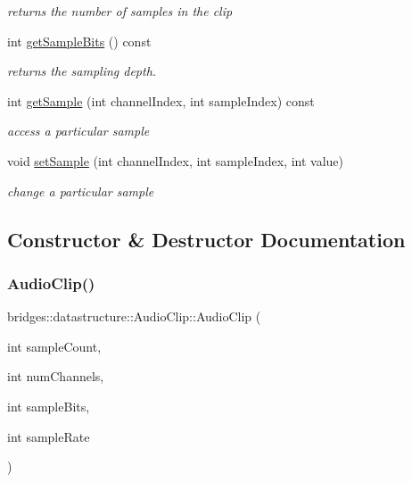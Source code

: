 \begin{DoxyCompactItemize}
\begin{DoxyCompactList}\small\item\em returns the number of samples in the clip \end{DoxyCompactList}\item 
int \hyperlink{classbridges_1_1datastructure_1_1_audio_clip_aca7c5460d005d62a7a0d2eae595e63d3}{get\+Sample\+Bits} () const
\begin{DoxyCompactList}\small\item\em returns the sampling depth. \end{DoxyCompactList}\item 
int \hyperlink{classbridges_1_1datastructure_1_1_audio_clip_a24bd273de32369cb9d979e7250759717}{get\+Sample} (int channel\+Index, int sample\+Index) const
\begin{DoxyCompactList}\small\item\em access a particular sample \end{DoxyCompactList}\item 
void \hyperlink{classbridges_1_1datastructure_1_1_audio_clip_aa7617402fd316152dd2585a5dbe33ded}{set\+Sample} (int channel\+Index, int sample\+Index, int value)
\begin{DoxyCompactList}\small\item\em change a particular sample \end{DoxyCompactList}\end{DoxyCompactItemize}


\subsection{Constructor \& Destructor Documentation}
\mbox{\label{classbridges_1_1datastructure_1_1_audio_clip_aa4db655f2e904a30742d45408ff6543c}} 
\subsubsection{\texorpdfstring{Audio\+Clip()}{AudioClip()}\hspace{0.1cm}{\footnotesize\ttfamily [1/2]}}
{\footnotesize\ttfamily bridges\+::datastructure\+::\+Audio\+Clip\+::\+Audio\+Clip (\begin{DoxyParamCaption}\item[{int}]{sample\+Count,  }\item[{int}]{num\+Channels,  }\item[{int}]{sample\+Bits,  }\item[{int}]{sample\+Rate }\end{DoxyParamCaption})\hspace{0.3cm}{\ttfamily [inline]}}



